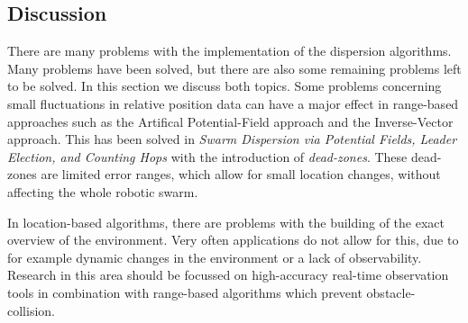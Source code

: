 \subsection{Discussion}
There are many problems with the implementation of the dispersion algorithms. Many problems have been solved, but there are also some remaining problems left to be solved. In this section we discuss both topics.
Some problems concerning small fluctuations in relative position data can have a major effect in range-based approaches such as the Artifical Potential-Field approach and the Inverse-Vector approach. This has been solved in \emph{Swarm Dispersion via Potential Fields, Leader Election, and Counting Hops} with the introduction of \emph{dead-zones}. These dead-zones are limited error ranges, which allow for small location changes, without affecting the whole robotic swarm.

In location-based algorithms, there are problems with the building of the exact overview of the environment. Very often applications do not allow for this, due to for example dynamic changes in the environment or a lack of observability. Research in this area should be focussed on high-accuracy real-time observation tools in combination with range-based algorithms which prevent obstacle-collision. 
